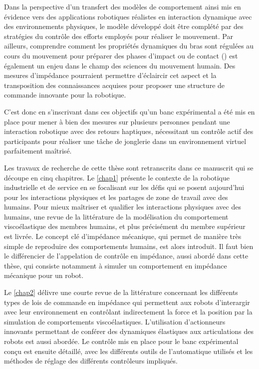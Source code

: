 %
Dans la perspective d’un transfert des modèles de comportement ainsi mis en évidence vers des applications robotiques réalistes en interaction dynamique avec des environnements physiques, le modèle développé doit être complété par des stratégies du contrôle des efforts employés pour réaliser le mouvement. Par ailleurs, comprendre comment les propriétés dynamiques du bras sont régulées au cours du mouvement pour préparer des phases d’impact ou de contact (\cite{tsuji_bio-mimetic_2008}) est également un enjeu dans le champ des sciences du mouvement humain. Des mesures d'impédance pourraient permettre d'éclaircir cet aspect et la transposition des connaissances acquises pour proposer une structure de commande innovante pour la robotique.%

C'est donc en s'inscrivant dans ces objectifs qu'un banc expérimental a été mis en place pour mener à bien des mesures sur plusieurs personnes pendant une interaction robotique avec des retours haptiques, nécessitant un contrôle actif des participants pour réaliser une tâche de jonglerie dans un environnement virtuel parfaitement maîtrisé.

Les travaux de recherche de cette thèse sont retranscrits dans ce manuscrit qui se découpe en cinq chapitres. Le \cref{chap1} présente le contexte de la robotique industrielle et de service en se focalisant sur les défis qui se posent aujourd'hui pour les interactions physiques et les partages de zone de travail avec des humains. Pour mieux maîtriser et qualifier les interactions physiques avec des humains, une revue de la littérature de la modélisation du comportement viscoélastique des membres humains, et plus précisément du membre supérieur est livrée. Le concept clé d'impédance mécanique, qui permet de manière très simple de reproduire des comportements humains, est alors introduit. Il faut bien le différencier de l'appelation de contrôle en impédance, aussi abordé dans cette thèse, qui consiste notamment à simuler un comportement en impédance mécanique pour un robot.

Le \cref{chap2} délivre une courte revue de la littérature concernant les différents types de lois de commande en impédance qui permettent aux robots d'interargir avec leur environnement en contrôlant indirectement la force et la position par la simulation de comportements viscoélastiques. L'utilisation d'actionneurs innovants permettant de conférer des dynamiques élastiques aux articulations des robots est aussi abordée. Le contrôle mis en place pour le banc expérimental conçu est ensuite détaillé, avec les différents outils de l'automatique utilisés et les méthodes de réglage des différents contrôleurs impliqués.

